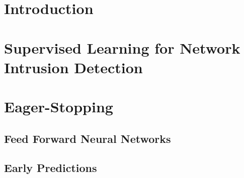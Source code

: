 \documentclass[9pt,sigconf,letterpaper,dvipsnames\ifx\removeHeaders\tempYes ,nonacm\fi]{acmart}
\begin{document}

\ifx\removeHeaders\tempYes
\fi
\maketitle



\section{Introduction}

\section{Supervised Learning for Network Intrusion Detection}

\section{Eager-Stopping}
\subsection{Feed Forward Neural Networks}

\subsection{Early Predictions}
\end{document}
